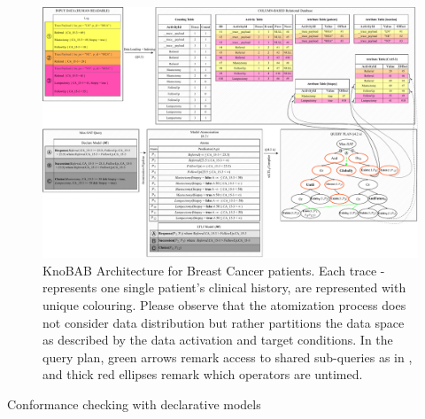 \begin{figure}
	\centering
	\includegraphics[width=\textwidth]{images/knobab_pipeline.pdf}
	\caption{KnoBAB Architecture for Breast Cancer patients. Each trace - represents one single patient's clinical history, are represented with unique colouring. Please observe that the atomization process does not consider data distribution but rather partitions the data space as described by the data activation and target conditions. In the query plan, green arrows remark access  to shared sub-queries as in \cite{BellatrecheKB21}, and thick red ellipses remark which operators are untimed. } \label{fig:knobab_pipeline}
\end{figure}
Conformance checking with declarative models
